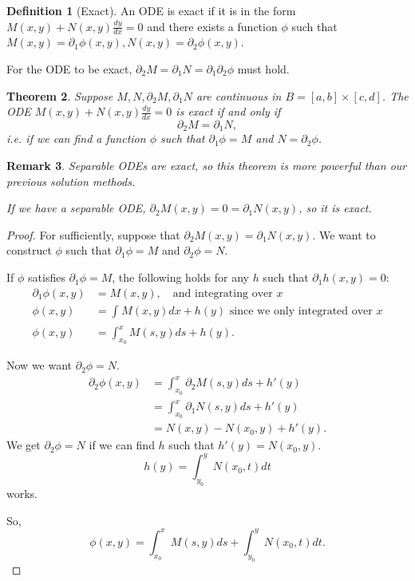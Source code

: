 \documentclass{tufte-handout}
\newtheorem{thm}{Theorem}[subsection]
\newtheorem{rmk}[thm]{Remark}
\theoremstyle{definition}
\newtheorem{defn}[thm]{Definition}
\begin{document}
\begin{defn}[Exact]
	An ODE is exact if it is in the form $M(x,y) + N(x,y)\frac{dy}{dx} = 0$ and there exists a function $\phi$ such that $M(x,y) = \partial_1 \phi(x,y), N(x,y) = \partial_2 \phi(x,y)$.
\end{defn}

For the ODE to be exact, $\partial_2 M = \partial_1 N = \partial_1\partial_2 \phi$ must hold.

\begin{thm}
	Suppose $M,N, \partial_2 M, \partial_1 N$ are continuous in $B = [a,b] \times [c,d]$. The ODE $M(x,y) + N(x,y) \frac{dy}{dx} = 0$ is exact if and only if \[
		\partial_2 M = \partial_1 N
	,\] i.e. if we can find a function $\phi$ such that $\partial_1 \phi = M$ and $N =\partial_2 \phi$.
\end{thm}

\begin{rmk}
	Separable ODEs are exact, so this theorem is more powerful than our previous solution methods. 

	If we have a separable ODE, $\partial_2 M(x,y) = 0 = \partial_1 N(x,y)$, so it is exact.
\end{rmk}

\begin{proof}
	 For sufficiently, suppose that $\partial_2 M(x,y) = \partial_1N(x,y)$. We want to construct $\phi$ such that $\partial_1\phi = M$ and $\partial_2 \phi = N$.

	If $\phi$ satisfies $\partial_1 \phi = M$, the following holds for any $h$ such that $\partial_1 h(x,y) = 0$:
	\begin{align*}
		\partial_1 \phi(x,y) &= M(x,y), \quad \text{and integrating over $x$} \\
		\phi(x,y) &= \int_{} M(x,y)dx + h(y) \text{ since we only integrated over } x \\
		\phi(x,y) &= \int_{x_0}^{x} M(s,y)ds + h(y)
	.\end{align*}

	Now we want $\partial_2 \phi = N$. 
	\begin{align*}
		\partial_2 \phi(x,y) &= \int_{x_0}^{x} \partial_2 M(s,y)ds + h'(y) \\
		&= \int_{x_0}^{x} \partial_1 N(s,y)ds + h'(y)  \\
		&= N(x,y) - N(x_0,y) + h'(y)
	.\end{align*}
	We get $\partial_2 \phi = N$ if we can find $h$ such that $h'(y) = N(x_0,y)$. \[
		h(y) = \int_{y_0}^{y} N(x_0,t)dt 
	\] works.

	So, \[
		\phi(x,y) = \int_{x_0}^{x} M(s,y)ds + \int_{y_0}^{y} N(x_0,t)dt  
	.\] 
\end{proof}
\end{document}
